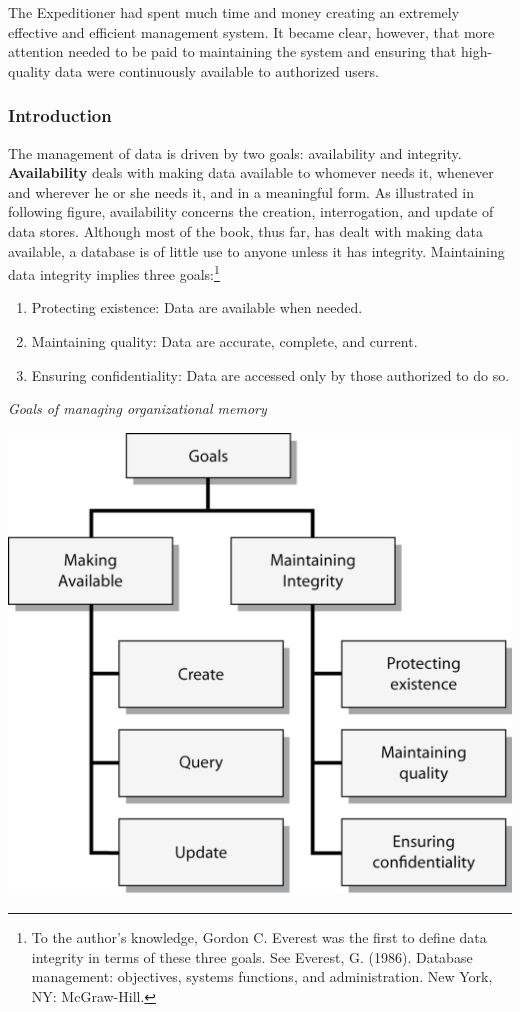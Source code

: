 \documentclass[
]{article}
\begin{document}
The Expeditioner had spent much time and money creating an extremely
effective and efficient management system. It became clear, however,
that more attention needed to be paid to maintaining the system and
ensuring that high-quality data were continuously available to
authorized users.

\hypertarget{introduction-4}{%
\subsubsection*{Introduction}\label{introduction-4}}

The management of data is driven by two goals: availability and
integrity. \textbf{Availability} deals with making data available to whomever
needs it, whenever and wherever he or she needs it, and in a meaningful
form. As illustrated in following figure, availability concerns the
creation, interrogation, and update of data stores. Although most of the
book, thus far, has dealt with making data available, a database is of
little use to anyone unless it has integrity. Maintaining data integrity
implies three goals:\footnote{To the author's knowledge, Gordon C. Everest was the first to
  define data integrity in terms of these three goals. See Everest, G.
  (1986). Database management: objectives, systems functions, and
  administration. New York, NY: McGraw-Hill.}

\begin{enumerate}
\def\labelenumi{\arabic{enumi}.}
\item
  Protecting existence: Data are available when needed.
\item
  Maintaining quality: Data are accurate, complete, and current.
\item
  Ensuring confidentiality: Data are accessed only by those authorized
  to do so.
\end{enumerate}

\emph{Goals of managing organizational memory}

\includegraphics{Figures/Chapter 23/goals.png}
\end{document}
